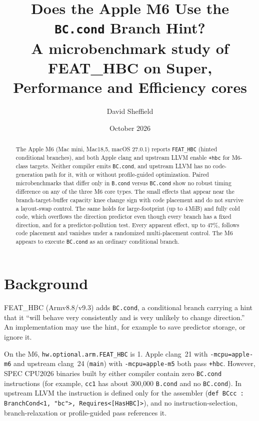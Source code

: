 \documentclass[10pt]{article}
\title{Does the Apple M6 Use the \texttt{BC.cond} Branch Hint?\\
\large A microbenchmark study of FEAT\_HBC on Super, Performance and Efficiency cores}
\author{David Sheffield}
\date{October 2026}
\begin{document}
\maketitle

\begin{abstract}
The Apple M6 (Mac mini, Mac18,5, macOS 27.0.1) reports \texttt{FEAT\_HBC} (hinted conditional
branches), and both Apple clang and upstream LLVM enable \texttt{+hbc} for M6-class targets.
Neither compiler emits \texttt{BC.cond}, and upstream LLVM has no code-generation path for it,
with or without profile-guided optimization. Paired microbenchmarks that differ only in
\texttt{B.cond} versus \texttt{BC.cond} show no robust timing difference on any of the three
M6 core types. The small effects that appear near the branch-target-buffer capacity knee
change sign with code placement and do not survive a layout-swap control. The same holds for
large-footprint (up to 4\,MiB) and fully cold code, which overflows the direction predictor
even though every branch has a fixed direction, and for a predictor-pollution test.
Every apparent effect, up to 47\%, follows code placement and vanishes under a
randomized multi-placement control. The M6 appears to
execute \texttt{BC.cond} as an ordinary conditional branch.
\end{abstract}

\section{Background}
FEAT\_HBC (Armv8.8/v9.3) adds \texttt{BC.cond}, a conditional branch carrying a hint that it
``will behave very consistently and is very unlikely to change direction.'' An implementation
may use the hint, for example to save predictor storage, or ignore it.

On the M6, \texttt{hw.optional.arm.FEAT\_HBC} is 1. Apple clang~21 with
\texttt{-mcpu=apple-m6} and upstream clang~24 (\texttt{main}) with \texttt{-mcpu=apple-m5}
both pass \texttt{+hbc}. However, SPEC CPU2026 binaries built by either compiler contain
zero \texttt{BC.cond} instructions (for example, \texttt{cc1} has about 300{,}000
\texttt{B.cond} and no \texttt{BC.cond}). In upstream LLVM the instruction is defined only
for the assembler (\texttt{def BCcc : BranchCond<1, "bc">, Requires<[HasHBC]>}), and no
instruction-selection, branch-relaxation or profile-guided pass references it.
\end{document}
